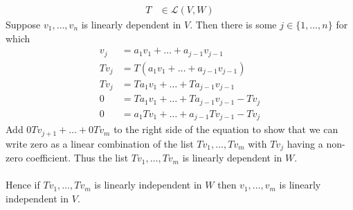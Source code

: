 \documentclass[a4paper]{article}
\begin{document}
%
\newcommand   \F { \mathbf{F}  }
\renewcommand \L { \mathcal{L} }
%
\large
\begin{align*}
    T &\in \L(V,W)
\end{align*}
Suppose $v_1,\dots,v_n$ is linearly dependent in $V$.
Then there is some $j \in \{1,\dots,n\}$ for which
\begin{align*}
     v_j &= a_1v_1 + \dots + a_{j-1}v_{j-1}             \\
    Tv_j &= T( a_1v_1 + \dots + a_{j-1}v_{j-1} )         \\
    Tv_j &= T a_1v_1 + \dots + T a_{j-1}v_{j-1}          \\
       0 &= T a_1v_1 + \dots + T a_{j-1}v_{j-1} - Tv_j    \\
       0 &= a_1 Tv_1 + \dots + a_{j-1} T v_{j-1} - Tv_j
\end{align*}
Add $0Tv_{j+1}+\dots+0Tv_m$ to the right side of the equation to show that we can write zero as a linear combination of the list $Tv_1,\dots,Tv_m$ with $Tv_j$ having a non-zero coefficient.
Thus the list $Tv_1,\dots,Tv_m$ is linearly dependent in $W$.
\\
\\
Hence if $Tv_1,\dots,Tv_m$ is linearly independent in $W$ then $v_1,\dots,v_m$ is linearly independent in $V$.
\end{document}
